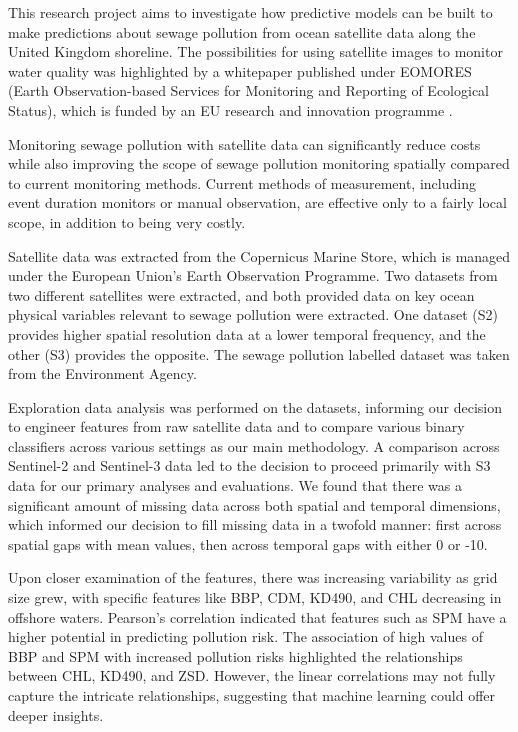 \documentclass[a4paper,11pt]{report}
\begin{document}
This research project aims to investigate how predictive models can be built to make predictions about sewage pollution from ocean satellite data along the United Kingdom shoreline. The possibilities for using satellite images to monitor water quality was highlighted by a whitepaper published under EOMORES (Earth Observation-based Services for Monitoring and Reporting of Ecological Status), which is funded by an EU research and innovation programme \citep{papathanasopoulou2019satellite}. 

Monitoring sewage pollution with satellite data can significantly reduce costs while also improving the scope of sewage pollution monitoring spatially compared to current monitoring methods. Current methods of measurement, including event duration monitors or manual observation, are effective only to a fairly local scope, in addition to being very costly. 

Satellite data was extracted from the Copernicus Marine Store, which is managed under the European Union's Earth Observation Programme. Two datasets from two different satellites were extracted, and both provided data on key ocean physical variables relevant to sewage pollution were extracted. One dataset (S2) provides higher spatial resolution data at a lower temporal frequency, and the other (S3) provides the opposite. The sewage pollution labelled dataset was taken from the Environment Agency. 

Exploration data analysis was performed on the datasets, informing our decision to engineer features from raw satellite data and to compare various binary classifiers across various settings as our main methodology. A comparison across Sentinel-2 and Sentinel-3 data led to the decision to proceed primarily with S3 data for our primary analyses and evaluations. We found that there was a significant amount of missing data across both spatial and temporal dimensions, which informed our decision to fill missing data in a twofold manner: first across spatial gaps with mean values, then across temporal gaps with either 0 or -10. 

Upon closer examination of the features, there was increasing variability as grid size grew, with specific features like BBP, CDM, KD490, and CHL decreasing in offshore waters. Pearson's correlation indicated that features such as SPM have a higher potential in predicting pollution risk. The association of high values of BBP and SPM with increased pollution risks highlighted the relationships between CHL, KD490, and ZSD. However, the linear correlations may not fully capture the intricate relationships, suggesting that machine learning could offer deeper insights.
\end{document}
